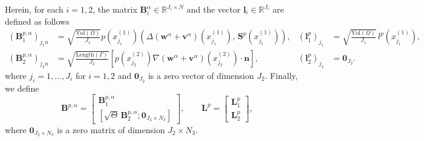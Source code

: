 \documentclass[oneside]{article}
\begin{document}
Herein, for each \( i = 1, 2 \), the matrix \( \mathbf{B}_i^\alpha \in \mathbb{R}^{J_i \times N} \) and the vector \( \mathbf{l}_i \in \mathbb{R}^{J_i} \) are defined as follows
\begin{equation}
    \begin{array}{rlrl}
(\mathbf{B}_1^{p, \alpha})_{j_1n} &= \displaystyle \sqrt{\frac{\text{Vol}(\Omega)}{J_1}} p(x_{j_1}^{(1)}) \left( \Delta \left(\mathbf{w}^{\alpha} + \mathbf{v}^{\alpha}\right)(x_{j_1}^{(1)}), \, \mathbf{S}^{p}(x_{j_1}^{(1)}) \right), &
(\mathbf{l}_1^p)_{j_1} &= \displaystyle \sqrt{\frac{\text{Vol}(\Omega)}{J_1}}\, l^p(x_{j_1}^{(1)}), \\[3mm]
(\mathbf{B}_2^{p, \alpha})_{j_2n} &= \displaystyle \sqrt{\frac{\text{Length}(\Gamma)}{J_2}} \left[ p(x_{j_2}^{(2)}) \nabla (\mathbf{w}^{\alpha} + \mathbf{v}^{\alpha})(x_{j_2}^{(2)}) \cdot \mathbf{n} \right],  &
(\mathbf{l}^p_2)_{j_2} &= \mathbf{0}_{J_2}.\label{eq2_jump_discretization}
\end{array}
\end{equation}
where $j_i = 1, \ldots, J_i$ for $i = 1, 2$ and $\mathbf{0}_{J_2}$ is a zero vector of dimension $J_2$.  Finally, we define
\begin{equation}
\mathbf{B}^{p,\alpha} =
\begin{bmatrix}
\mathbf{B}^{p,\alpha}_1  \\[3mm]
[\sqrt{\Theta}\,\mathbf{B}^{p,\alpha}_2; \mathbf{0}_{J_2\times N_3}]
\end{bmatrix},
\qquad
\mathbf{L}^p =
\begin{bmatrix}
 \mathbf{L}^p_1 \\[3mm]
\mathbf{L}^p_2
\end{bmatrix},
\end{equation}
where $\mathbf{0}_{J_2\times N_3}$ is a zero matrix of dimension $J_2\times N_3$.



\end{document}
